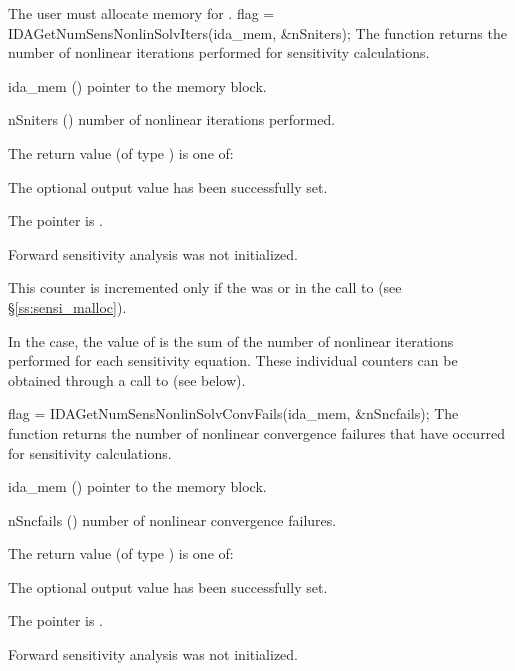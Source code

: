 {
  The user must allocate memory for .
}
{
  flag = IDAGetNumSensNonlinSolvIters(ida\_mem, \&nSniters);
}
{
  The function  returns the
  number of nonlinear iterations performed for 
  sensitivity calculations.
}
{
  \begin{args}
  \item[ida\_mem] ()
    pointer to the {\idas} memory block.
  \item[nSniters] ()
    number of nonlinear iterations performed.
  \end{args}
}
{
  The return value  (of type ) is one of:
  \begin{args}
  \item[\Id{IDA\_SUCCESS}] 
    The optional output value has been successfully set.
  \item[\Id{IDA\_MEM\_NULL}]
    The  pointer is .
  \item[\Id{IDA\_NO\_SENS}]
    Forward sensitivity analysis was not initialized.
  \end{args}
}
{
  This counter is incremented only if the  was  or 
   in the call to  (see \S\ref{ss:sensi_malloc}).
  
  In the  case, the value of  is the sum of 
  the number of nonlinear iterations performed for each sensitivity equation.
  These individual counters can be obtained through a call to
   (see below).
}
{
  flag = IDAGetNumSensNonlinSolvConvFails(ida\_mem, \&nSncfails);
}
{
  The function  returns the
  number of nonlinear convergence failures that have occurred for
  sensitivity calculations.
}
{
  \begin{args}
  \item[ida\_mem] ()
    pointer to the {\idas} memory block.
  \item[nSncfails] ()
    number of nonlinear convergence failures.
  \end{args}
}
{
  The return value  (of type ) is one of:
  \begin{args}
  \item[\Id{IDA\_SUCCESS}] 
    The optional output value has been successfully set.
  \item[\Id{IDA\_MEM\_NULL}]
    The  pointer is .
  \item[\Id{IDA\_NO\_SENS}]
    Forward sensitivity analysis was not initialized.
  \end{args}
}

